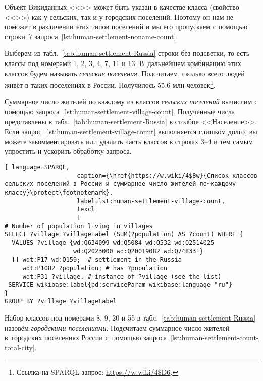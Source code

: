 Объект Викиданных <<>> 
может быть указан в качестве класса (свойство <<>>) 
как у сельских, так и у городских поселений. 
Поэтому он нам не поможет в различении этих типов поселений 
и мы его пропускаем с помощью строки~7 запроса~\ref{lst:human-settlement-noname-count}.



\newpage
Выберем из табл.~\ref{tab:human-settlement-Russia} строки без подсветки, 
то есть классы под номерами 1, 2, 3, 4, 7, 11 и 13. 
В~дальнейшем комбинацию этих классов будем называть \emph{сельские поселения}. 
Подсчитаем, сколько всего людей живёт в таких поселениях в России. 
Получилось \num{55,6} млн человек\footnote{%
Ссылка на SPARQL-запрос: \url{https://w.wiki/4$D6}.%
}. 

Суммарное число жителей по каждому из классов \emph{сельских поселений} 
вычислим с помощью запроса~\ref{lst:human-settlement-village-count}. 
Полученные числа представлены в табл.~\ref{tab:human-settlement-Russia} в столбце <<Население>>. 
Если запрос~\ref{lst:human-settlement-village-count} выполняется слишком долго, 
вы можете закомментировать или удалить часть классов в строках 3--4 
и тем самым упростить и ускорить обработку запроса. 

\begin{lstlisting}[ language=SPARQL, 
                    caption={\href{https://w.wiki/4$8w}{Список классов сельских поселений в России и суммарное число жителей по~каждому классу}\protect\footnotemark},
                    label=lst:human-settlement-village-count,
                    texcl 
                    ]
# Number of population living in villages
SELECT ?village ?villageLabel (SUM(?population) AS ?count) WHERE {  
  VALUES ?village {wd:Q634099 wd:Q5084 wd:Q532 wd:Q2514025 
                   wd:Q2023000 wd:Q20019082 wd:Q748331}
  [] wdt:P17 wd:Q159;  # settlement in the Russia
     wdt:P1082 ?population; # has ?population
     wdt:P31 ?village. # instance of ?village (see the list)
 SERVICE wikibase:label{bd:serviceParam wikibase:language "ru"}
}
GROUP BY ?village ?villageLabel
\end{lstlisting}%



Набор классов под номерами 8, 9, 20 и 55 в табл.~\ref{tab:human-settlement-Russia} 
назовём \emph{городскими поселениями}. 
Подсчитаем суммарное число жителей в~городских поселениях России 
с~помощью запроса~\ref{lst:human-settlement-count-total-city}. 


